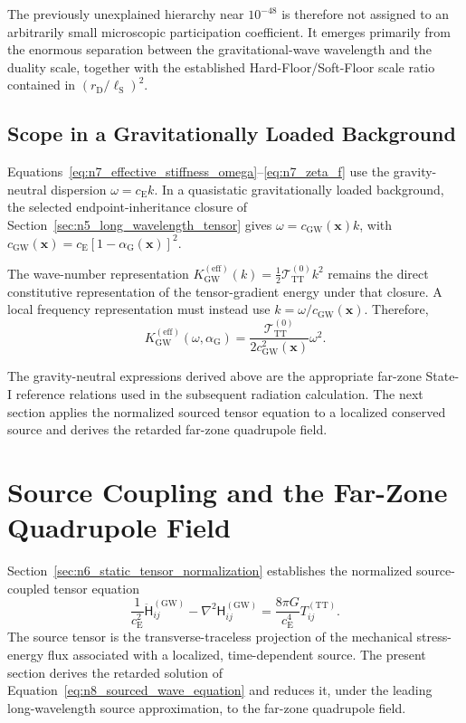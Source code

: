The previously unexplained hierarchy near $10^{-48}$ is therefore not assigned to an arbitrarily small microscopic participation coefficient. It emerges primarily from the enormous separation between the gravitational-wave wavelength and the duality scale, together with the established Hard-Floor/Soft-Floor scale ratio contained in $(r_{\mathrm{D}}/\ell_{\mathrm{S}})^{2}$.

\subsection{Scope in a Gravitationally Loaded Background}
\label{subsec:n7_loaded_background_scope}

Equations~\eqref{eq:n7_effective_stiffness_omega}--\eqref{eq:n7_zeta_f} use the gravity-neutral dispersion $\omega = c_{\mathrm{E}}k$. In a quasistatic gravitationally loaded background, the selected endpoint-inheritance closure of Section~\ref{sec:n5_long_wavelength_tensor} gives $\omega = c_{\mathrm{GW}}(\mathbf{x})k$, with $c_{\mathrm{GW}}(\mathbf{x}) = c_{\mathrm{E}} \left[ 1-\alpha_{\mathrm{G}}(\mathbf{x}) \right]^{2}$.

The wave-number representation $K_{\mathrm{GW}}^{(\mathrm{eff})}(k) = \frac{1}{2} \mathcal{T}_{\mathrm{TT}}^{(0)}k^{2}$ remains the direct constitutive representation of the tensor-gradient energy under that closure. A local frequency representation must instead use $k = \omega/c_{\mathrm{GW}}(\mathbf{x})$. Therefore,
\begin{equation}
    K_{\mathrm{GW}}^{(\mathrm{eff})} \left( \omega,\alpha_{\mathrm{G}} \right) = \frac{\mathcal{T}_{\mathrm{TT}}^{(0)}}{2c_{\mathrm{GW}}^{2}(\mathbf{x})} \omega^{2}.
\end{equation}

The gravity-neutral expressions derived above are the appropriate far-zone State-I reference relations used in the subsequent radiation calculation. The next section applies the normalized sourced tensor equation to a localized conserved source and derives the retarded far-zone quadrupole field.

\section{Source Coupling and the Far-Zone Quadrupole Field}
\label{sec:n8_source_quadrupole}

Section~\ref{sec:n6_static_tensor_normalization} establishes the normalized source-coupled tensor equation
\begin{equation}
    \frac{1}{c_{\mathrm{E}}^{2}} \ddot{\mathsf{H}}_{ij}^{(\mathrm{GW})} - \nabla^{2}\mathsf{H}_{ij}^{(\mathrm{GW})} = \frac{8\pi G}{c_{\mathrm{E}}^{4}} T_{ij}^{(\mathrm{TT})}.
    \label{eq:n8_sourced_wave_equation}
\end{equation}
The source tensor is the transverse-traceless projection of the mechanical stress-energy flux associated with a localized, time-dependent source. The present section derives the retarded solution of Equation~\eqref{eq:n8_sourced_wave_equation} and reduces it, under the leading long-wavelength source approximation, to the far-zone quadrupole field.

